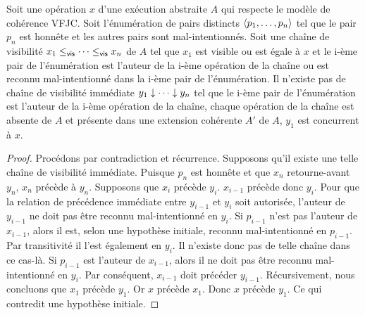 \begin{proposition}
Soit une opération $x$ d'une exécution abstraite $A$ qui respecte le modèle de cohérence \ac{VFJC}.
Soit l'énumération de pairs distincts $\tuple*{p_1, \dotsc ,p_n}$ tel que le pair $p_n$ est honnête et les autres pairs sont mal-intentionnés.
Soit une chaîne de visibilité $x_1 \viseq \dotsb \viseq x_n$ de $A$ tel que $x_1$ est visible ou est égale à $x$ et le i-ème pair de l'énumération est l'auteur de la i-ème opération de la chaîne ou est reconnu mal-intentionné dans la i-ème pair de l'énumération.
Il n'existe pas de chaîne de visibilité immédiate $y_1 \idr \dotsb \idr y_n$ tel que le i-ème pair de l'énumération est l'auteur de la i-ème opération de la chaîne, chaque opération de la chaîne est absente de $A$ et présente dans une extension cohérente $A'$ de $A$, $y_1$ est concurrent à $x$.
\end{proposition}

\begin{proof}
Procédons par contradiction et récurrence.
Supposons qu'il existe une telle chaîne de visibilité immédiate.
Puisque $p_n$ est honnête et que $x_n$ retourne-avant $y_n$, $x_n$ précède à $y_n$.
Supposons que $x_i$ précède $y_i$.
$x_{i-1}$ précède donc $y_i$.
Pour que la relation de précédence immédiate entre $y_{i-1}$ et $y_i$ soit autorisée, l'auteur de $y_{i-1}$ ne doit pas être reconnu mal-intentionné en $y_i$.
Si $p_{i-1}$ n'est pas l'auteur de $x_{i-1}$, alors il est, selon une hypothèse initiale, reconnu mal-intentionné en $p_{i-1}$.
Par transitivité il l'est également en $y_i$.
Il n'existe donc pas de telle chaîne dans ce cas-là.
Si $p_{i-1}$ est l'auteur de $x_{i-1}$, alors il ne doit pas être reconnu mal-intentionné en $y_i$.
Par conséquent, $x_{i-1}$ doit précéder $y_{i-1}$.
Récursivement, nous concluons que $x_1$ précède $y_1$.
Or $x$ précède $x_1$.
Donc $x$ précède $y_1$.
Ce qui contredit une hypothèse initiale.
\end{proof}


